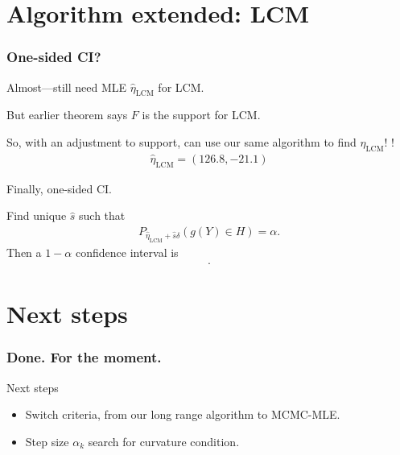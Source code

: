 \documentclass[ 10pt]{beamer}
\newcommand{\etaLCM}{\hat{\eta}_{\textrm{LCM}}}
\begin{document}
\section{Algorithm extended: LCM}
\frame
{
\frametitle{One-sided CI?}  
Almost---still need MLE $\etaLCM$ for LCM.
\vspace{1mm}
\pause

But earlier theorem says $F$ is the support for LCM.
\vspace{1mm}

So, with an adjustment to support, can use our same algorithm to find $\etaLCM$!   \alert{\checkmark}!
\pause
\begin{align*}
	\etaLCM = (126.8, -21.1)
\end{align*}

Finally, one-sided CI.
\pause

Find unique $\hat{s}$ such that
\begin{align*}
		P_{\etaLCM + \hat{s} \delta}( g(Y) \in H) = \alpha.
\end{align*}
Then a $1- \alpha$ confidence interval is
\begin{align*}
[ \etaLCM + \hat{s} \delta, + \infty).
\end{align*}

In this example, we calculate a non-simultaneous 95\% confidence region
\begin{align*}
	[9.145, +\infty) \\
	(-\infty, -1.500].
\end{align*}
}
\section{Next steps}
\frame
{
\frametitle{Done.  For the moment.}


Next steps
\begin{itemize}
	\item Switch criteria, from our long range algorithm to MCMC-MLE.  
	\item Step size $\alpha_k$ search for curvature condition.
\end{itemize}
}
\end{document}
